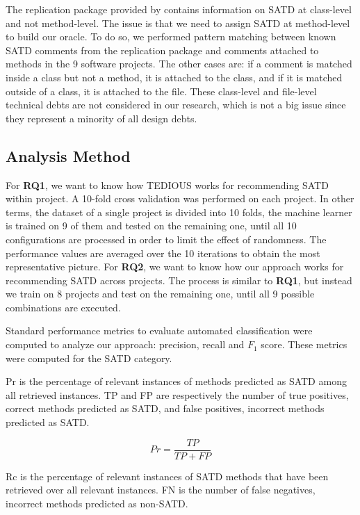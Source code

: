 The replication package provided by \citet{maldonado17} contains information on \ac{SATD} at class-level and not method-level. The issue is that we need to assign \ac{SATD} at method-level to build our oracle. To do so, we performed pattern matching between known \ac{SATD} comments from the replication package and comments attached to methods in the 9 software projects. The other cases are: if a comment is matched inside a class but not a method, it is attached to the class, and if it is matched outside of a class, it is attached to the file. These class-level and file-level technical debts are not considered in our research, which is not a big issue since they represent a minority of all design debts.

\subsection{Analysis Method}


For \textbf{RQ1}, we want to know how \ac{TEDIOUS} works for recommending \ac{SATD} within project. A 10-fold cross validation was performed on each project. In other terms, the dataset of a single project is divided into 10 folds, the machine learner is trained on 9 of them and tested on the remaining one, until all 10 configurations are processed in order to limit the effect of randomness. The performance values are averaged over the 10 iterations to obtain the most representative picture. For \textbf{RQ2}, we want to know how our approach works for recommending \ac{SATD} across projects. The process is similar to \textbf{RQ1}, but instead we train on 8 projects and test on the remaining one, until all 9 possible combinations are executed. \par 

Standard performance metrics to evaluate automated classification were computed to analyze our approach: precision, recall and $F_{1}$ score. These metrics were computed for the \ac{SATD} category. \par 

\ac{Pr} is the percentage of relevant instances of methods predicted as \ac{SATD} among all retrieved instances. \ac{TP} and \ac{FP} are respectively the number of true positives, correct methods predicted as \ac{SATD}, and false positives, incorrect methods predicted as \ac{SATD}.

\[
Pr=\frac{TP}{TP+FP}
\]

\ac{Rc} is the percentage of relevant instances of \ac{SATD} methods that have been retrieved over all relevant instances. \ac{FN} is the number of false negatives, incorrect methods predicted as non-\ac{SATD}.

